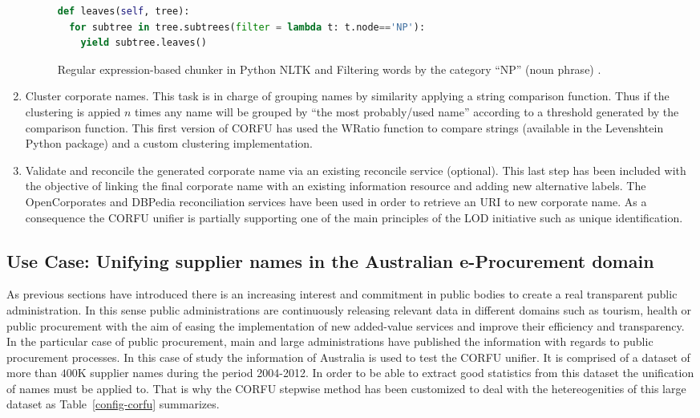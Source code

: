 \documentclass{llncs}
\begin{document}
\begin{enumerate}
\begin{figure}[!h]
\begin{center}
\begin{lstlisting}[language=Python]
def leaves(self, tree):
  for subtree in tree.subtrees(filter = lambda t: t.node=='NP'):
    yield subtree.leaves()
\end{lstlisting}
\caption{Regular expression-based chunker in Python NLTK and Filtering words by the category ``NP'' (noun phrase) .}
\label{figure:step-4}
\end{center}
\end{figure}   

\item Cluster corporate names. This task is in charge of grouping names by similarity applying 
a string comparison function. Thus if the clustering is appied $n$ times any name 
will be grouped by ``the most probably/used name'' according to a threshold generated 
by the comparison function. This first version of CORFU has used the WRatio function to 
compare strings (available in the Levenshtein Python package) and a custom clustering 
implementation.

\item Validate and reconcile the generated corporate name via an existing reconcile service (optional). This last 
step has been included with the objective of linking the final corporate name with an existing information 
resource and adding new alternative labels. The OpenCorporates and DBPedia reconciliation services have 
been used in order to retrieve an URI to new corporate name. As a consequence the CORFU unifier is partially supporting 
one of the main principles of the LOD initiative such as unique identification.
\end{enumerate}
% 
%
\subsection{Use Case: Unifying supplier names in the Australian e-Procurement domain}
As previous sections have introduced there is an increasing interest and commitment 
in public bodies to create a real transparent public administration. In this sense 
public administrations are continuously releasing relevant data in different domains 
such as tourism, health or public procurement with the aim of easing the implementation 
of new added-value services and improve their efficiency and transparency. In the particular 
case of public procurement, main and large administrations have published the information 
with regards to public procurement processes. In this case of study the 
information of Australia is used to test the CORFU unifier. It is comprised of a dataset 
of more than $400$K supplier names during the period 2004-2012. In order to be able to extract 
good statistics from this dataset the unification of names must be applied to. That is why 
the CORFU stepwise method has been customized to deal with the hetereogenities of this large 
dataset as Table~\ref{config-corfu} summarizes.
\end{document}
